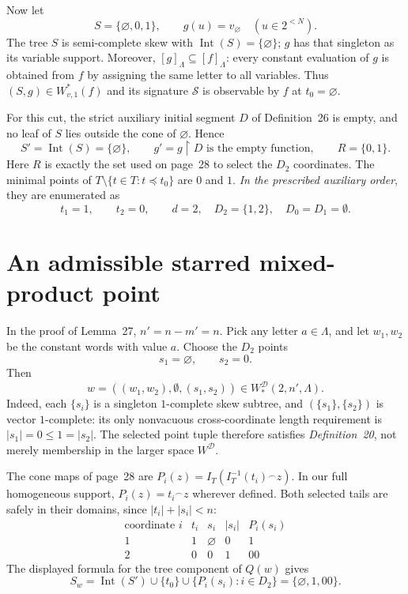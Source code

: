 \documentclass[11pt,a4paper]{article}
\newcommand{\eps}{\varnothing}
\newcommand{\starred}{W^{\mathcal D}_*}
\newcommand{\Int}{\operatorname{Int}}
\newcommand{\sym}[1]{v_{#1}}
\begin{document}
Now let
\[
  S=\{\eps,0,1\}, \qquad g(u)=\sym\eps
  \quad(u\in 2^{<N}).
\]
The tree $S$ is semi-complete skew with $\Int(S)=\{\eps\}$;
$g$ has that singleton as its variable support. Moreover,
$[g]_\Lambda\subseteq[f]_\Lambda$: every constant evaluation of $g$
is obtained from $f$ by assigning the same letter to all variables.
Thus $(S,g)\in W^*_{v,1}(f)$ and its signature $\mathcal S$
is observable by $f$ at $t_0=\eps$.

For this cut, the strict auxiliary initial segment $D$ of
Definition~26 is empty, and no leaf of $S$ lies outside the cone
of $\eps$. Hence
\[
  S'=\Int(S)=\{\eps\},\qquad g'=g\upharpoonright D
  \text{ is the empty function},\qquad
  R=\{0,1\}.
\]
Here $R$ is exactly the set used on page~28 to select the $D_2$
coordinates. The minimal points of
$T\setminus\{t\in T:t\preceq t_0\}$ are $0$ and $1$.
\emph{In the prescribed auxiliary order}, they are enumerated as
\[
 t_1=1,\qquad t_2=0,\qquad d=2,\quad D_2=\{1,2\},\quad D_0=D_1=\emptyset.
\]

\section*{An admissible starred mixed-product point}
In the proof of Lemma~27, $n'=n-m'=n$. Pick any letter $a\in\Lambda$,
and let $w_1,w_2$ be the constant words with value $a$. Choose the
$D_2$ points
\[
                 s_1=\eps, \qquad s_2=0.
\]
Then
\[
      w=((w_1,w_2),\emptyset,(s_1,s_2))
        \in \starred(2,n',\Lambda).
\]
Indeed, each $\{s_i\}$ is a singleton $1$-complete skew subtree,
and $(\{s_1\},\{s_2\})$ is vector $1$-complete: its only nonvacuous
cross-coordinate length requirement is
$|s_1|=0\leq1=|s_2|$.
The selected point tuple therefore satisfies \emph{Definition~20},
not merely membership in the larger space $W^{\mathcal D}$.

The cone maps of page~28 are $P_i(z)=I_T(I_T^{-1}(t_i)
\mathbin{^\frown}z)$. In our full homogeneous support,
$P_i(z)=t_i\mathbin{^\frown}z$ wherever defined. Both selected tails
are safely in their domains, since $|t_i|+|s_i|<n$:
\[
\begin{array}{c|c|c|c|c}
\text{coordinate }i&t_i&s_i&|s_i|&P_i(s_i)\\\hline
1&1&\eps&0&1\\
2&0&0&1&00
\end{array}
\]
The displayed formula for the tree component of $Q(w)$ gives
\begin{equation}\label{eq:tree}
 S_w=\Int(S')\cup\{t_0\}\cup
       \{P_i(s_i):i\in D_2\}
     =\{\eps,1,00\}.
\end{equation}
\end{document}
